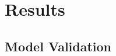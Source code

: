 \documentclass[preprint,authoryear,12pt]{elsarticle}
\begin{document}
 



\pagebreak
\clearpage

%

\pagebreak
\clearpage



 

\pagebreak
\clearpage

\pagebreak
\clearpage
%
%

\section{Results}\label{section:results}

\subsection{Model Validation}
\end{document}
